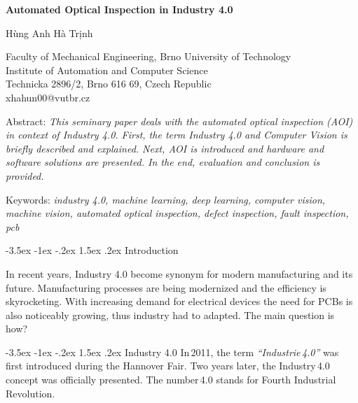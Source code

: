 \documentclass[a4paper,10pt]{article}
\makeatletter
\theoremstyle{definition}
\renewcommand\section{\@startsection {section}{1}{\z@}%
	{-3.5ex \@plus -1ex \@minus -.2ex}%
	{1.5ex \@plus.2ex}%
	{\large\bfseries}}
\makeatother
\begin{document}
	\pagestyle{empty}
	
	\begin{center}
		{\bf \Large Automated Optical Inspection in Industry 4.0}
	\end{center}
	
	\smallskip
	\begin{center}
		{\large Hùng Anh Hà Trịnh}
	\end{center}
	
	\smallskip
	\begin{center}
		Faculty of Mechanical Engineering, Brno University of Technology\\
		Institute of Automation and Computer Science\\
		Technicka 2896/2, Brno 616 69, Czech Republic\\
		xhahun00@vutbr.cz\\
	\end{center}
	
	\bigskip
	\noindent Abstract: \textit{This seminary paper deals with the automated optical inspection (AOI) in context of Industry 4.0. First, the term Industry 4.0 and Computer Vision is briefly described and explained. Next, AOI is introduced and hardware and software solutions are presented. In the end, evaluation and conclusion is provided.}
	
	\vspace*{10pt} \noindent Keywords: \textit{industry 4.0, machine learning, deep learning, computer vision, machine vision, automated optical inspection, defect inspection, fault inspection, pcb}
	
	\bigskip
	\section{Introduction}
	\label{sec:1}
	
	In recent years, Industry 4.0 become synonym for modern manufacturing and its future. Manufacturing processes are being modernized and the efficiency is skyrocketing. With increasing demand for electrical devices the need for PCBs is also noticeably growing, thus industry had to adapted. The main question is how?
	
	\section{Industry 4.0}
	\label{sec:2}
	In\,2011, the term \textit{``Industrie\,4.0''} was first introduced during the Hannover Fair. Two years later, the Industry\,4.0 concept was officially presented. The number\,4.0 stands for Fourth Industrial Revolution. \cite{industry_4_0}
	
\end{document}
